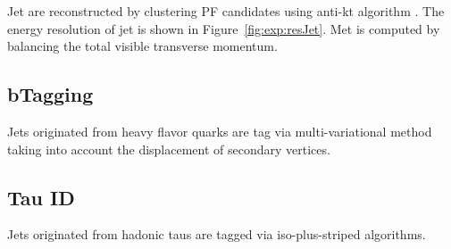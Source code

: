 Jet are reconstructed by clustering PF candidates using anti-kt algorithm \cite{tech:antikt:Cacciari:2008gp}. The energy resolution of jet is shown in Figure~\ref{fig:exp:resJet}. Met is computed by balancing the total visible transverse momentum. 



\subsection{bTagging}
Jets originated from heavy flavor quarks are tag via multi-variational method taking into account the displacement of secondary vertices.

\subsection{Tau ID}
 Jets originated from hadonic taus are tagged via iso-plus-striped algorithms.





